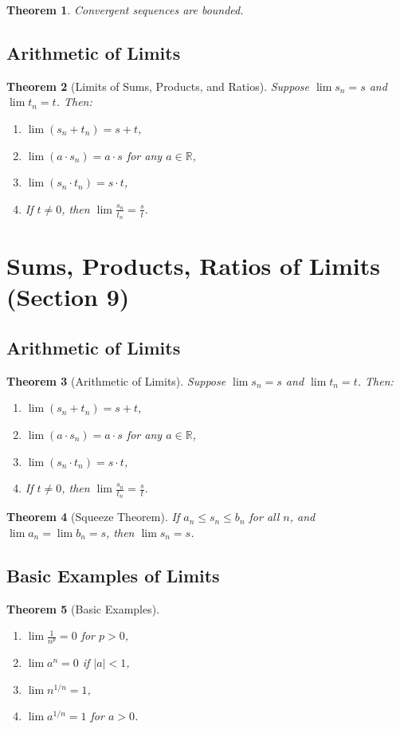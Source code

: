 \documentclass[9pt]{article}
\theoremstyle{definition}
\theoremstyle{plain}
\newtheorem{theorem}{Theorem}
\begin{document}
\begin{theorem}
Convergent sequences are bounded.
\end{theorem}

\subsection*{Arithmetic of Limits}
\begin{theorem}[Limits of Sums, Products, and Ratios]
Suppose $ \lim s_n = s $ and $ \lim t_n = t $. Then:
\begin{enumerate}
    \item $ \lim (s_n + t_n) = s + t $,
    \item $ \lim (a \cdot s_n) = a \cdot s $ for any $ a \in \mathbb{R} $,
    \item $ \lim (s_n \cdot t_n) = s \cdot t $,
    \item If $ t \neq 0 $, then $ \lim \frac{s_n}{t_n} = \frac{s}{t} $.
\end{enumerate}
\end{theorem}
\section*{Sums, Products, Ratios of Limits (Section 9)}

\subsection*{Arithmetic of Limits}
\begin{theorem}[Arithmetic of Limits]
Suppose $ \lim s_n = s $ and $ \lim t_n = t $. Then:
\begin{enumerate}
    \item $ \lim (s_n + t_n) = s + t $,
    \item $ \lim (a \cdot s_n) = a \cdot s $ for any $ a \in \mathbb{R} $,
    \item $ \lim (s_n \cdot t_n) = s \cdot t $,
    \item If $ t \neq 0 $, then $ \lim \frac{s_n}{t_n} = \frac{s}{t} $.
\end{enumerate}
\end{theorem}

\begin{theorem}[Squeeze Theorem]
If $ a_n \leq s_n \leq b_n $ for all $ n $, and $ \lim a_n = \lim b_n = s $, then $ \lim s_n = s $.
\end{theorem}

\subsection*{Basic Examples of Limits}
\begin{theorem}[Basic Examples]

\begin{enumerate}
    \item $ \lim \frac{1}{n^p} = 0 $ for $ p > 0 $,
    \item $ \lim a^n = 0 $ if $ |a| < 1 $,
    \item $ \lim n^{1/n} = 1 $,
    \item $ \lim a^{1/n} = 1 $ for $ a > 0 $.
\end{enumerate}
\end{theorem}
\end{document}
